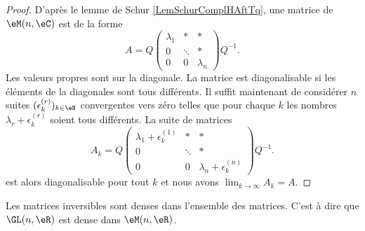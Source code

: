 \begin{proof}
    D'après le lemme de Schur \ref{LemSchurComplHAftTq}, une matrice de \( \eM(n,\eC)\) est de la forme
    \begin{equation}
        A=Q\begin{pmatrix}
            \lambda_1    &   *    &   *    \\
              0  &   \ddots    &   *    \\
            0    &   0    &   \lambda_n
        \end{pmatrix}Q^{-1}.
    \end{equation}
    Les valeurs propres sont sur la diagonale. La matrice est diagonalisable si les éléments de la diagonales sont tous différents. Il suffit maintenant de considérer \( n\) suites \( (\epsilon^{(r)}_k)_{k\in\eN}\) convergentes vers zéro telles que pour chaque \( k\) les nombres \( \lambda_r+\epsilon^{(r)}_k\) soient tous différents. La suite de matrices
    \begin{equation}
        A_k=Q\begin{pmatrix}
            \lambda_1+\epsilon^{(1)}_k    &   *    &   *    \\
              0  &   \ddots    &   *    \\
              0    &   0    &   \lambda_n+\epsilon^{(n)}_k
        \end{pmatrix}Q^{-1}.
    \end{equation}
    est alors diagonalisable pour tout \( k\) et nous avons \( \lim_{k\to \infty} A_k=A\).
\end{proof}

\begin{proposition} \label{PropQGUPooVudelJ}
    Les matrices inversibles sont denses dans l'ensemble des matrices. C'est à dire que \( \GL(n,\eR)\) est dense dans \( \eM(n,\eR)\).
\end{proposition}

